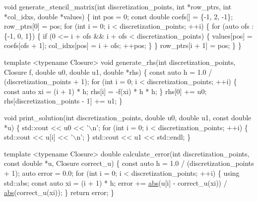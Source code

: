 \begin{DoxyCodeInclude}
\textcolor{keywordtype}{void} generate\_stencil\_matrix(\textcolor{keywordtype}{int} discretization\_points, \textcolor{keywordtype}{int} *row\_ptrs,
                             \textcolor{keywordtype}{int} *col\_idxs, \textcolor{keywordtype}{double} *values)
\{
    \textcolor{keywordtype}{int} pos = 0;
    \textcolor{keyword}{const} \textcolor{keywordtype}{double} coefs[] = \{-1, 2, -1\};
    row\_ptrs[0] = pos;
    \textcolor{keywordflow}{for} (\textcolor{keywordtype}{int} i = 0; i < discretization\_points; ++i) \{
        \textcolor{keywordflow}{for} (\textcolor{keyword}{auto} ofs : \{-1, 0, 1\}) \{
            \textcolor{keywordflow}{if} (0 <= i + ofs && i + ofs < discretization\_points) \{
                values[pos] = coefs[ofs + 1];
                col\_idxs[pos] = i + ofs;
                ++pos;
            \}
        \}
        row\_ptrs[i + 1] = pos;
    \}
\}


\textcolor{keyword}{template} <\textcolor{keyword}{typename} Closure>
\textcolor{keywordtype}{void} generate\_rhs(\textcolor{keywordtype}{int} discretization\_points, Closure f, \textcolor{keywordtype}{double} u0, \textcolor{keywordtype}{double} u1,
                  \textcolor{keywordtype}{double} *rhs)
\{
    \textcolor{keyword}{const} \textcolor{keyword}{auto} h = 1.0 / (discretization\_points + 1);
    \textcolor{keywordflow}{for} (\textcolor{keywordtype}{int} i = 0; i < discretization\_points; ++i) \{
        \textcolor{keyword}{const} \textcolor{keyword}{auto} xi = (i + 1) * h;
        rhs[i] = -f(xi) * h * h;
    \}
    rhs[0] += u0;
    rhs[discretization\_points - 1] += u1;
\}


\textcolor{keywordtype}{void} print\_solution(\textcolor{keywordtype}{int} discretization\_points, \textcolor{keywordtype}{double} u0, \textcolor{keywordtype}{double} u1,
                    \textcolor{keyword}{const} \textcolor{keywordtype}{double} *u)
\{
    std::cout << u0 << \textcolor{charliteral}{'\(\backslash\)n'};
    \textcolor{keywordflow}{for} (\textcolor{keywordtype}{int} i = 0; i < discretization\_points; ++i) \{
        std::cout << u[i] << \textcolor{charliteral}{'\(\backslash\)n'};
    \}
    std::cout << u1 << std::endl;
\}


\textcolor{keyword}{template} <\textcolor{keyword}{typename} Closure>
\textcolor{keywordtype}{double} calculate\_error(\textcolor{keywordtype}{int} discretization\_points, \textcolor{keyword}{const} \textcolor{keywordtype}{double} *u,
                       Closure correct\_u)
\{
    \textcolor{keyword}{const} \textcolor{keyword}{auto} h = 1.0 / (discretization\_points + 1);
    \textcolor{keyword}{auto} error = 0.0;
    \textcolor{keywordflow}{for} (\textcolor{keywordtype}{int} i = 0; i < discretization\_points; ++i) \{
        \textcolor{keyword}{using} std::abs;
        \textcolor{keyword}{const} \textcolor{keyword}{auto} xi = (i + 1) * h;
        error += \hyperlink{namespacegko_a57797fc0a00fd4b7ff34ca4bfc84bc51}{abs}(u[i] - correct\_u(xi)) / \hyperlink{namespacegko_a57797fc0a00fd4b7ff34ca4bfc84bc51}{abs}(correct\_u(xi));
    \}
    \textcolor{keywordflow}{return} error;
\}



\end{DoxyCodeInclude}
